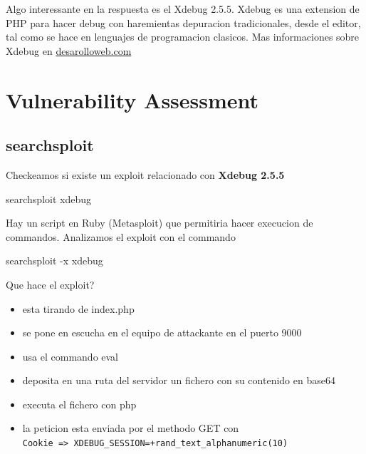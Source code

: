 \documentclass{assets/ipesethesis}
\newenvironment{Shaded}{\begin{snugshade}}{\end{snugshade}}
\newcommand{\ExtensionTok}[1]{#1}
\newcommand{\NormalTok}[1]{#1}
\providecommand{\tightlist}{%
  \setlength{\itemsep}{0pt}\setlength{\parskip}{0pt}}
\begin{document}
Algo interessante en la respuesta es el Xdebug 2.5.5. Xdebug es una extension de PHP para hacer debug con haremientas
depuracion tradicionales, desde el editor, tal como se hace en lenguajes de programacion clasicos. Mas informaciones sobre
Xdebug en \href{https://desarrolloweb.com/articulos/que-es-instalar-configurar-xdebug.html}{desarolloweb.com}

\hypertarget{vulnerability-assessment}{%
\section*{Vulnerability Assessment}\label{vulnerability-assessment}}

\hypertarget{searchsploit}{%
\subsection*{searchsploit}\label{searchsploit}}

Checkeamos si existe un exploit relacionado con \textbf{Xdebug 2.5.5}

\begin{Shaded}
\begin{Highlighting}[]
\ExtensionTok{searchsploit}\NormalTok{ xdebug}
\end{Highlighting}
\end{Shaded}

Hay un script en Ruby (Metasploit) que permitiria hacer execucion de commandos. Analizamos el exploit con el commando

\begin{Shaded}
\begin{Highlighting}[]
\ExtensionTok{searchsploit}\NormalTok{ -x xdebug}
\end{Highlighting}
\end{Shaded}

Que hace el exploit?

\begin{itemize}
\tightlist
\item
  esta tirando de index.php
\item
  se pone en escucha en el equipo de attackante en el puerto 9000
\item
  usa el commando eval
\item
  deposita en una ruta del servidor un fichero con su contenido en base64
\item
  executa el fichero con php
\item
  la peticion esta enviada por el methodo GET con \texttt{\textquotesingle{}Cookie\textquotesingle{}\ =\textgreater{}\ \textquotesingle{}XDEBUG\_SESSION=+rand\_text\_alphanumeric(10)\textquotesingle{}}
\end{itemize}
\end{document}
